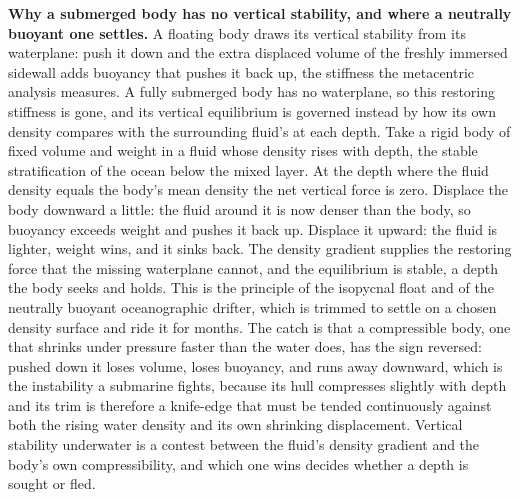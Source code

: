 \begin{mastery}
\textbf{Why a submerged body has no vertical stability, and where a
neutrally buoyant one settles.} A floating body draws its vertical
stability from its waterplane: push it down and the extra displaced volume
of the freshly immersed sidewall adds buoyancy that pushes it back up, the
stiffness the metacentric analysis measures. A fully submerged body has no
waterplane, so this restoring stiffness is gone, and its vertical
equilibrium is governed instead by how its own density compares with the
surrounding fluid's at each depth. Take a rigid body of fixed volume and
weight in a fluid whose density rises with depth, the stable stratification
of the ocean below the mixed layer. At the depth where the fluid density
equals the body's mean density the net vertical force is zero. Displace the
body downward a little: the fluid around it is now denser than the body, so
buoyancy exceeds weight and pushes it back up. Displace it upward: the
fluid is lighter, weight wins, and it sinks back. The density gradient
supplies the restoring force that the missing waterplane cannot, and the
equilibrium is stable, a depth the body seeks and holds. This is the
principle of the isopycnal float and of the neutrally buoyant
oceanographic drifter, which is trimmed to settle on a chosen density
surface and ride it for months. The catch is that a compressible body,
one that shrinks under pressure faster than the water does, has the sign
reversed: pushed down it loses volume, loses buoyancy, and runs away
downward, which is the instability a submarine fights, because its hull
compresses slightly with depth and its trim is therefore a knife-edge that
must be tended continuously against both the rising water density and its
own shrinking displacement. Vertical stability underwater is a contest
between the fluid's density gradient and the body's own compressibility,
and which one wins decides whether a depth is sought or fled.
\end{mastery}

